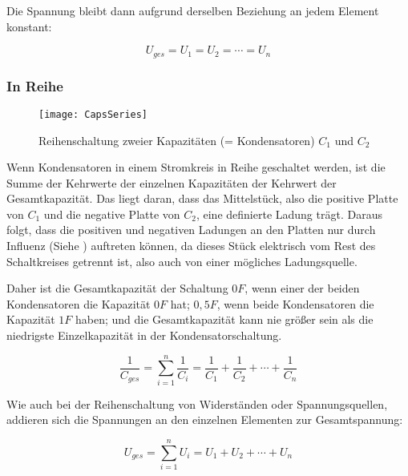 \noindent Die Spannung bleibt dann aufgrund derselben Beziehung an jedem Element konstant:

\begin{equation}
	U_{ges} = U_1 = U_2 = \cdots = U_n
\end{equation}


\subsubsection{In Reihe}

\begin{figure}[h!]
	\centering
	\texttt{[image: CapsSeries]}
	\caption{Reihenschaltung zweier Kapazitäten (= Kondensatoren) $C_1$ und $C_2$}
\end{figure}

Wenn Kondensatoren in einem Stromkreis in Reihe geschaltet werden, ist die Summe der Kehrwerte der einzelnen Kapazitäten der Kehrwert der Gesamtkapazität. Das liegt daran, dass das \glqq Mittelstück\grqq , also die positive Platte von $C_1$ und die negative Platte von $C_2$, eine definierte Ladung trägt. Daraus folgt, dass die positiven und negativen Ladungen an den Platten nur durch Influenz (Siehe ) auftreten können, da dieses Stück elektrisch vom Rest des Schaltkreises getrennt ist, also auch von einer mögliches Ladungsquelle.

Daher ist die Gesamtkapazität der Schaltung $0F$, wenn einer der beiden Kondensatoren die Kapazität $0F$ hat; $0,5F$, wenn beide Kondensatoren die Kapazität $1F$ haben; und die Gesamtkapazität kann nie größer sein als die niedrigste Einzelkapazität in der Kondensatorschaltung.

\begin{equation}
	\frac{1}{C_{ges}} = \sum\limits_{i=1}^n \frac{1}{C_i} = \frac{1}{C_1} + \frac{1}{C_2} + \cdots + \frac{1}{C_n}
\end{equation}

\noindent Wie auch bei der Reihenschaltung von Widerständen oder Spannungsquellen, addieren sich die Spannungen an den einzelnen Elementen zur Gesamtspannung:

\begin{equation}
	U_{ges} = \sum\limits_{i=1}^n U_i = U_1 + U_2 + \cdots + U_n
\end{equation}

